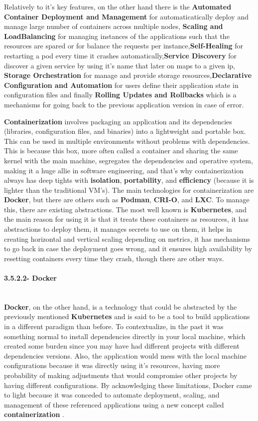 Relatively to it's key features, on the other hand there is the \textbf{Automated Container Deployment and Management} for automaticatically deploy and manage large number of containers across multiple nodes, \textbf{Scaling and LoadBalancing} for managing instances of the applications such that the resources are spared or for balance the requests per instance,\textbf{Self-Healing} for restarting a pod every time it crashes automatically,\textbf{Service Discovery} for discover a given service by using it's name that later on maps to a given ip, \textbf{Storage Orchestration} for manage and provide storage resources,\textbf{Declarative Configuration and Automation} for users define their application state in configuration files and finally \textbf{Rolling Updates and Rollbacks} which is a mechanisms for going back to the previous application version in case of error.

\textbf{Containerization} involves packaging an application and its dependencies (libraries, configuration files, and binaries) into a lightweight and portable box. This can be used in multiple environments without problems with dependencies. This is because this box, more often called a container and  sharing the same kernel with the main machine, segregates the dependencies and operative system, making it a huge allie in software engineering, and that's why containerization always has deep tights with \textbf{isolation}, \textbf{portability}, and \textbf{efficiency} (because it is lighter than the traditional VM's). The main technologies for containerization are \textbf{Docker}, but there are others such as \textbf{Podman}, \textbf{CRI-O}, and \textbf{LXC}. To manage this, there are existing abstractions. The most well known is \textbf{Kubernetes}, and the main reason for using it is that it treats these containers as resources, it has abstractions to deploy them, it manages secrets to use on them, it helps in creating horizontal and vertical scaling depending on metrics, it has mechanisms to go back in case the deployment goes wrong, and it ensures high availability by resetting containers every time they crash, though there are other ways.


\paragraph{3.5.2.2- Docker}\mbox{}\\
\textbf{Docker}, on the other hand, is a  technology that could be abstracted by the previously mentioned \textbf{Kubernetes} and is said to be a tool to build applications in a different paradigm than before. To contextualize, in the past it was something normal to install dependencies directly in your local machine, which created some burden since you may have had different projects with different dependencies versions. Also, the application would mess with the local machine configurations because it was directly using it's resources, having more probability of making adjustments that would compromise other projects by having different configurations. By acknowledging these limitations, Docker came to light because it was conceded to automate deployment, scaling, and management of these referenced applications using a new concept called \textbf{containerization} \cite{docker}. 

